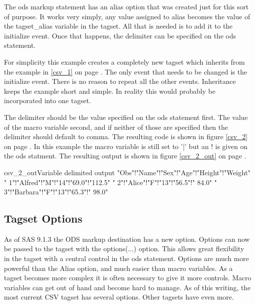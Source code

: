 The ods markup statement has an alias option that was created just for
this sort of purpose.
It works very simply, any value assigned to alias becomes
the value of the tagset\_alias variable in the tagset.  All that is needed
is to add it to the initialize event.  Once that happens, the delimiter can
be specified on the ods statement.

For simplicity this example creates a completely new tagset which inherits
from the example in \ref{csv_1} on page \pageref{csv_1}.  The only event that
needs to be changed is the initialize event.  There is no reason to repeat
all the other events.  Inheritance keeps the example short and simple.
In reality this would probably be incorporated into one tagset.

The delimiter should be the value specified on the ods statement first.  The
value of the macro variable second, and if neither of those are specified
then the delimiter should default to comma.
The resulting code is shown in figure \ref{csv_2} on page \pageref{csv_2}.
In this example the macro variable is still set to '|' but an ! is given
on the ods statment.  
The resulting output is shown in figure \ref{csv_2_out} on page 
\pageref{csv_2_out}.


\begin{poutput}{csv_2_out}{Variable delimited output}
"Obs"!"Name"!"Sex"!"Age"!"Height"!"Weight"
" 1"!"Alfred"!"M"!"14"!"69.0"!"112.5"
" 2"!"Alice"!"F"!"13"!"56.5"!" 84.0"
" 3"!"Barbara"!"F"!"13"!"65.3"!" 98.0"
\end{poutput}

\subsection{Tagset Options}
As of SAS 9.1.3 the ODS markup destination has a new option.  Options can
now be passed to the tagset with the options(...) option.  This allows 
great flexibility in the tagset with a central control in the ods 
statement.  Options are much more powerful than the Alias option, and
much easier than macro variables.  As a tagset becomes more complex it
is often necessary to give it more controls.  Macro variables can get
out of hand and become hard to manage.  As of this writing, the most 
current CSV tagset has several options.  Other tagsets have even more.

